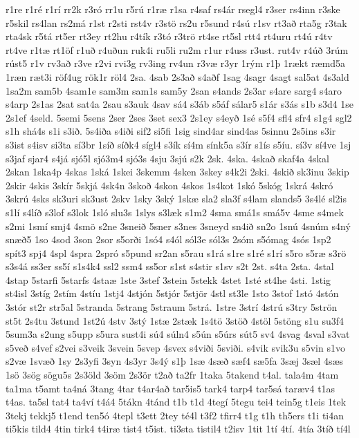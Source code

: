 {r1re
r1ré
r1rí
rr2k
r3ró
rr1u
r5rú
r1ræ
r1sa
r4saf
rs4ár
rsegl4
r3ser
rs4inn
r3ske
r5skil
rs4lan
rs2má
r1st
r2sti
rst4v
r3stö
rs2u
r5sund
r4sú
r1sv
rt3að
rta5g
r3tak
rta4sk
r5tá
rt5er
rt3ey
rt2hu
r4tík
r3tó
r3trö
rt4se
rt5sl
rtt4
rt4uru
rt4ú
r4tv
rt4ve
r1tæ
rt1öf
r1uð
r4uðun
ruk4i
ru5li
ru2m
r1ur
r4uss
r3ust.
rut4v
r4úð
3rúm
rúst5
r1v
rv3að
r3ve
r2vi
rvi3g
rv3ing
rv4un
r3væ
r3yr
1rým
r1þ
1rækt
ræmd5a
1ræn
ræt3i
röf4ug
rök1r
röl4
2sa.
4sab
2s3að
s4aðf
1sag
4sagr
4sagt
sal5at
4s3ald
1sa2m
sam5b
4sam1e
sam3m
sam1s
sam5y
2san
s4ands
2s3ar
s4are
sarg4
s4aro
s4arp
2s1as
2sat
sat4a
2sau
s3auk
4sav
sá4
s3áb
s5áf
sálar5
s1ár
s3ás
s1b
s3d4
1se
2s1ef
4seld.
5semi
5sens
2ser
2ses
3set
sex3
2s1ey
s4eyð
1sé
s5f4
sfl4
sfr4
s1g4
sgl2
s1h
shá4s
s1i
s3ið.
5s4iða
s4iði
sif2
si5fi
1sig
sind4ar
sind4as
5sinnu
2s5ins
s3ir
s3ist
s4isv
si3ta
sí3br
1síð
síðk4
sígl4
s3ík
sí4m
sínk5a
s3ír
s1ís
s5íu.
sí3v
sí4ve
1sj
s3jaf
sjar4
s4já
sjó5l
sjó3m4
sjó3s
4sju
3sjú
s2k
2sk.
4ska.
4skað
skaf4a
4skal
2skan
1ska4p
4skas
1ská
1skei
3skemm
4sken
3skey
s4k2i
2ski.
4skið
sk3inu
3skip
2skir
4skis
3skír
5skjá
4sk4n
3skoð
4skon
4skos
1s4kot
1skó
5skóg
1skrá
4skró
3skrú
4sks
sk3uri
sk3ust
2skv
1sky
3ský
1skæ
sla2
sla3f
s4lam
slands5
3s4lé
sl2is
s1lí
s4líð
s3lof
s3lok
1sló
slu3s
1slys
s3læk
s1m2
4sma
smá1s
smá5v
4sme
s4mek
s2mi
1smí
smj4
4smö
s2ne
3sneið
5sner
s3nes
3sneyd
sn4ið
sn2o
1snú
4snúm
s4ný
snæð5
1so
4sod
3son
2sor
s5orði
1só4
s4ól
sól3e
sól3s
2sóm
s5ómag
4sós
1sp2
spít3
spj4
4spl
4spra
2spró
s5pund
sr2an
s5rau
s1rá
s1re
s1ré
s1rí
s5ro
s5ræ
s3rö
s3s4á
ss3er
ss5í
s1s4k4
ssl2
ssm4
ss5or
s1st
s4stir
s1sv
s2t
2st.
s4ta
2sta.
4stal
4stap
5starfi
5starfs
4staæ
1ste
3stef
3stein
5stekk
4stet
1sté
st4he
4sti.
1stig
st4isl
3stíg
2stím
4stíu
1stj4
4stjón
5stjór
5stjör
4stl
st3le
1sto
3stof
1stó
4stón
3stór
st2r
str5al
5stranda
5strang
5straum
5strá.
1stre
3strí
4strú
s3try
5strön
st5t
2s4tu
3stund
1st2ú
4stv
3stý
1stæ
2stæk
1s4tö
3stöð
4stöl
5stöng
s1u
su3f4
5sum3a
s2ung
s5upp
s5ura
sust4i
sú4
súln4
s5ún
s5úrs
sút5
sv4
4svag
4sval
s3vat
s5veð
s4vef
s2vei
s3veik
3svein
5svep
4svex
s4viði
5sviði.
s4vik
svik3u
s5vin
s1vo
s2væ
1svæð
1sy
2s3yfi
3syn
4s3yr
3s4ý
s1þ
1sæ
4sæð
sæf4
sæ5fa
3sæj
3sæl
4sæs
1sö
3sög
sögu5s
2s3öld
3söm
2s3ör
t2að
ta2fr
1taka
5takend
t4al.
tala4m
4tam
ta1ma
t5amt
ta4ná
3tang
4tar
t4ar4að
tar5is5
tark4
tarp4
tar5sá
taræv4
t1as
t4as.
ta5sl
tat4
ta4ví
t4á4
5tákn
4tánd
t1b
t1d
4tegí
5tegu
tei4
tein5g
t1eis
1tek
3tekj
tekkj5
t1end
ten5ó
4tepl
t3ett
2tey
té4l
t3f2
tfirr4
t1g
t1h
th5ers
t1i
ti4an
ti5kis
tild4
4tin
tirk4
t4iræ
tist4
t5ist.
ti3sta
tistil4
t2isv
1tit
1tí
4tí.
4tía
3tíð
tí4l
}
